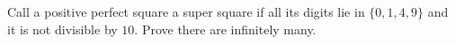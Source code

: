 Call a positive perfect square a super square if all its digits lie in $\{0,1,4,9\}$ and it is not divisible by $10$. Prove there are infinitely many.
